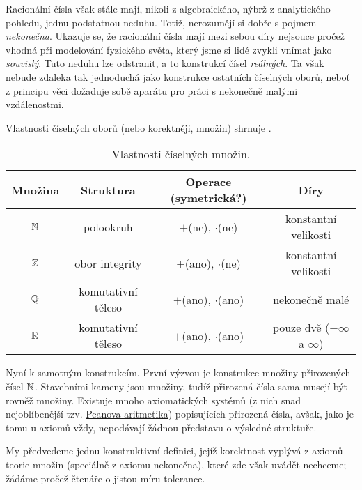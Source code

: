 Racionální čísla však stále mají, nikoli z algebraického, nýbrž z analytického
pohledu, jednu podstatnou neduhu. Totiž, nerozumějí si dobře s pojmem
\emph{nekonečna}. Ukazuje se, že racionální čísla mají mezi sebou  díry nejsouce pročež vhodná při modelování fyzického světa, který jsme si
lidé zvykli vnímat jako \emph{souvislý}. Tuto neduhu lze odstranit, a to
konstrukcí čísel \emph{reálných}. Ta však nebude zdaleka tak jednoduchá jako
konstrukce ostatních číselných oborů, neboť z principu věci dožaduje sobě
aparátu pro práci s nekonečně malými vzdálenostmi.

Vlastnosti číselných oborů (nebo korektněji, množin) shrnuje
.

\begin{table}[ht]
 \centering
 \begin{tabular}{cccc}
  \textbf{Množina} & \textbf{Struktura} & \textbf{Operace (symetrická?)} &
  \textbf{Díry}\\
  \toprule
  $\mathbb{N}$ & polookruh & $+$(ne), $ \cdot $(ne) & konstantní velikosti\\
  $\mathbb{Z}$ & obor integrity & $+$(ano), $ \cdot $(ne) & konstantní velikosti\\
  $\mathbb{Q}$ & komutativní těleso & $+$(ano), $ \cdot $(ano) & nekonečně malé\\
  $\mathbb{R}$ & komutativní těleso & $+$(ano), $ \cdot $(ano) & pouze dvě ($-\infty$ a
  $\infty$)
 \end{tabular}
 \caption{Vlastnosti číselných množin.}
 \label{table:vlastnosti-ciselnych-mnozin}
\end{table}
Nyní k samotným konstrukcím. První výzvou je konstrukce množiny přirozených
čísel $\mathbb{N}$. Stavebními kameny jsou množiny, tudíž přirozená čísla sama musejí
být rovněž množiny. Existuje mnoho axiomatických systémů (z nich snad
nejoblíbenější tzv.
\href{https://cs.wikipedia.org/wiki/Peanova_aritmetika}{Peanova aritmetika})
popisujících přirozená čísla, avšak, jako je tomu u axiomů vždy, nepodávají
žádnou představu o výsledné struktuře.

My předvedeme jednu konstruktivní definici, jejíž korektnost vyplývá z axiomů
teorie množin (speciálně z axiomu nekonečna), které zde však uvádět nechceme;
žádáme pročež čtenáře o jistou míru tolerance.

